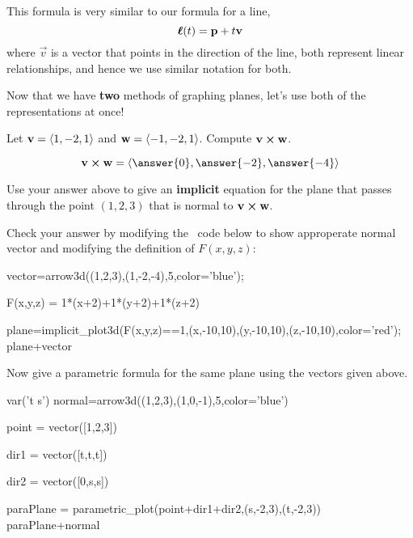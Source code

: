 \documentclass{ximera}
\begin{document}
This formula is very similar to our formula for a line,
\[
\boldsymbol{\ell}(t) = \mathbf{p} + t\mathbf{v}
\]
where $\vec{v}$ is a vector that points in the direction of the line,
both represent linear relationships, and hence we use similar notation
for both.

Now that we have \textbf{two} methods of graphing planes, let's use
both of the representations at once!

\begin{question}
  Let $\mathbf{v} = \left\langle 1,-2,1\right\rangle$ and $\mathbf{w} =
  \left\langle -1,-2,1\right\rangle$. Compute $\mathbf{v}\boldsymbol\times\mathbf{w}$.
  \begin{prompt}
    \[
    \vec{v}\cross\vec{w} = \vector{\answer{0},\answer{-2},\answer{-4}}
    \]
  \end{prompt}
  \begin{question}
    Use your answer above to give an \textbf{implicit} equation for
    the plane that passes through the point $(1,2,3)$ that is normal
    to $\mathbf{v}\boldsymbol\times\mathbf{w}$.
    \begin{onlineOnly}
      Check your answer by modifying the \sage\ code below to show
      approperate normal vector and modifying the definition of
      $F(x,y,z)$:
      \begin{sageCell}
vector=arrow3d((1,2,3),(1,-2,-4),5,color='blue');
        
F(x,y,z) = 1*(x+2)+1*(y+2)+1*(z+2)

plane=implicit_plot3d(F(x,y,z)==1,(x,-10,10),(y,-10,10),(z,-10,10),color='red');
plane+vector
      \end{sageCell}
    \end{onlineOnly}
    \begin{question}
      Now give a parametric formula for the same plane using the vectors given above.
      \begin{sageCell}
var('t s')
normal=arrow3d((1,2,3),(1,0,-1),5,color='blue')

point = vector([1,2,3])

dir1 = vector([t,t,t])

dir2 = vector([0,s,s])

paraPlane = parametric_plot(point+dir1+dir2,(s,-2,3),(t,-2,3))
paraPlane+normal
      \end{sageCell}
    \end{question}
  \end{question}
\end{question}
\end{document}
